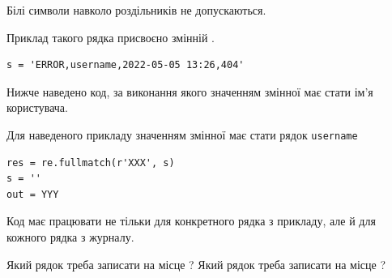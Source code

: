 \documentclass[12pt, ukrainian]{article}
\def\code#1{\Verb!#1!}
\begin{document}
{Білі символи навколо роздільників не допускаються.

Приклад такого рядка присвоєно змінній .



\begin{verbatim}
s = 'ERROR,username,2022-05-05 13:26,404'
\end{verbatim}


Нижче наведено код, за виконання якого значенням змінної  має стати ім'я користувача.

Для наведеного прикладу значенням змінної  має стати рядок \code{username}



\begin{verbatim}
res = re.fullmatch(r'XXX', s)
s = ''
out = YYY
\end{verbatim}


Код має працювати не тільки для конкретного рядка з прикладу, але й для кожного рядка з журналу.


Який рядок треба записати на місце  ?
Який рядок треба записати на місце  ?\par

}
\newpage
\end{document}
